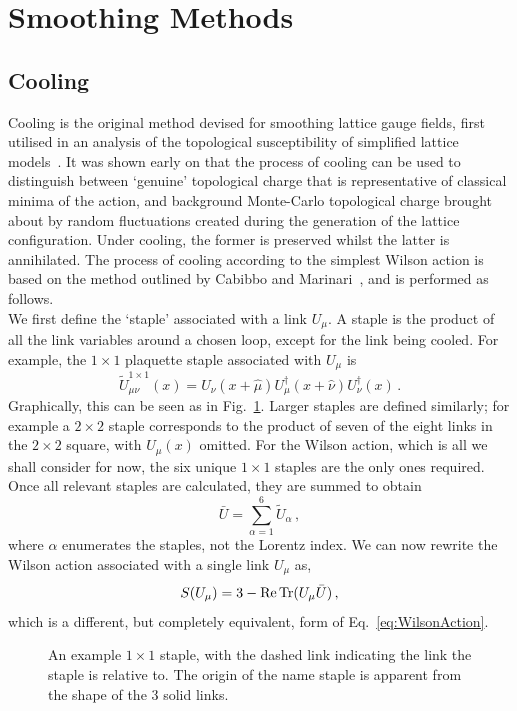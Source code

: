 \section{Smoothing Methods}
\subsection{Cooling}
Cooling is the original method devised for smoothing lattice gauge fields, first utilised in an analysis of the topological susceptibility of simplified lattice models~\cite{Berg:1981nw}. It was shown early on that the process of cooling can be used to distinguish between `genuine' topological charge that is representative of classical minima of the action, and background Monte-Carlo topological charge brought about by random fluctuations created during the generation of the lattice configuration. Under cooling, the former is preserved whilst the latter is annihilated. The process of cooling according to the simplest Wilson action is based on the method outlined by Cabibbo and Marinari~\cite{Cabibbo:1982zn,Creutz:1980zw}, and is performed as follows.\\

We first define the `staple' associated with a link $U_\mu$. A staple is the product of all the link variables around a chosen loop, except for the link being cooled. For example, the $1\times 1$ plaquette staple associated with $U_\mu$ is
%
\begin{equation}
\tilde { U }^{1\times 1} _ { \mu \nu}(x) = U _ { \nu } ( x + \hat { \mu } ) U _ { \mu } ^ { \dagger } ( x + \hat { \nu } ) U _ { \nu } ^ { \dagger } ( x )\, .
\end{equation}
%
Graphically, this can be seen as in Fig.~\ref{fig:Staple}. Larger staples are defined similarly; for example a $2\times 2$ staple corresponds to the product of seven of the eight links in the $2\times 2$ square, with $U_\mu(x)$ omitted. For the Wilson action, which is all we shall consider for now, the six unique $1\times 1$ staples are the only ones required. Once all relevant staples are calculated, they are summed to obtain
%
\begin{equation}
\bar{U} = \sum_{\alpha = 1} ^ 6 \tilde{U}_\alpha\, ,
\label{eq:Staples}
\end{equation}
where $\alpha$ enumerates the staples, not the Lorentz index. We can now rewrite the Wilson action associated with a single link $U_\mu$ as, 
%
\begin{equation}
S(U_\mu) = 3 - \operatorname{Re}\operatorname{Tr} (U_\mu \bar{U})\, ,
\label{eq:WilsonActionCool}
\end{equation}
%
which is a different, but completely equivalent, form of Eq.~\ref{eq:WilsonAction}.\\ %
\begin{figure}[ht!]
\centering

\caption[An example $1\times 1$ staple.]{\label{fig:Staple} An example $1\times 1$ staple, with the dashed link indicating the link the staple is relative to. The origin of the name staple is apparent from the shape of the 3 solid links.}
\end{figure}
%

